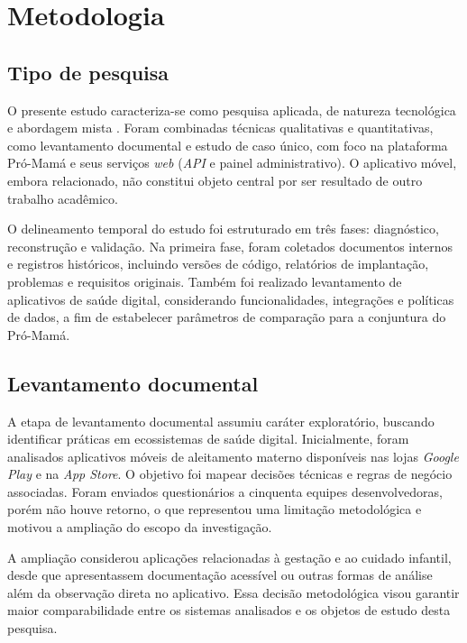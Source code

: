 \chapter{Metodologia}\label{cap_metodologia}

\section{Tipo de pesquisa}

O presente estudo caracteriza-se como pesquisa aplicada, de natureza tecnológica e abordagem mista \cite{siena2024metodologia}. Foram combinadas técnicas qualitativas e quantitativas, como levantamento documental e estudo de caso único, com foco na plataforma Pró-Mamá e seus serviços \emph{web} (\emph{API} e painel administrativo). O aplicativo móvel, embora relacionado, não constitui objeto central por ser resultado de outro trabalho acadêmico.

O delineamento temporal do estudo foi estruturado em três fases: diagnóstico, reconstrução e validação. Na primeira fase, foram coletados documentos internos e registros históricos, incluindo versões de código, relatórios de implantação, problemas e requisitos originais. Também foi realizado levantamento de aplicativos de saúde digital, considerando funcionalidades, integrações e políticas de dados, a fim de estabelecer parâmetros de comparação para a conjuntura do Pró-Mamá.

\section{Levantamento documental}

A etapa de levantamento documental assumiu caráter exploratório, buscando identificar práticas em ecossistemas de saúde digital. Inicialmente, foram analisados aplicativos móveis de aleitamento materno disponíveis nas lojas \emph{Google Play} e na \emph{App Store}. O objetivo foi mapear decisões técnicas e regras de negócio associadas. Foram enviados questionários a cinquenta equipes desenvolvedoras, porém não houve retorno, o que representou uma limitação metodológica e motivou a ampliação do escopo da investigação.

A ampliação considerou aplicações relacionadas à gestação e ao cuidado infantil, desde que apresentassem documentação acessível ou outras formas de análise além da observação direta no aplicativo. Essa decisão metodológica visou garantir maior comparabilidade entre os sistemas analisados e os objetos de estudo desta pesquisa.


